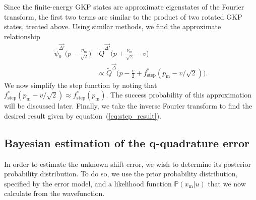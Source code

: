 \documentclass[prx,reprint,superscriptaddress,longbibliography,floatfix,nofootinbib]{revtex4-1}
\begin{document}
Since the finite-energy GKP states are approximate eigenstates of the Fourier transform, the first two terms are similar to the product of two rotated GKP states, treated above. Using similar methods, we find the approximate relationship
\begin{equation}
\begin{split}
\tilde{\psi}^{\vec{\Delta'}}_{0}\Big(p-\frac{p_{\text{m}}}{\sqrt{2}}\Big) &\cdot 
    \tilde{Q}^{\vec{\Delta'}}\Big(p+\frac{p_{\text{m}}}{\sqrt{2}}-v\Big) \\
    &\propto \tilde{Q}^{\vec{\Delta}}\Big(p - \frac{v}{2}+f^{*}_\mathrm{step}(p_\mathrm{m}-v/\sqrt{2})\Big).
    \label{eq:reindex_calc}
\end{split}
\end{equation}
We now simplify the step function by noting that $f^{*}_\mathrm{step}(p_\mathrm{m}-v/\sqrt{2}) \approx f^{*}_\mathrm{step}(p_\mathrm{m})$. The success probability of this approximation will be discussed later. Finally, we take the inverse Fourier transform to find the desired result given by equation~(\ref{eq:step_result}).

\subsection{Bayesian estimation of the q-quadrature error}
In order to estimate the unknown shift error, we wish to determine its posterior probability distribution. To do so, we use the prior probability distribution, specified by the error model, and a likelihood function $\mathbb{P}(x_\text{m}|u)$ that we now calculate from the wavefunction.
\end{document}
